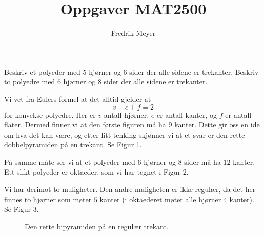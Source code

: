 \documentclass[11pt, norsk]{article}
\begin{document}
\title{Oppgaver MAT2500}
\author{Fredrik Meyer}
\maketitle 
\begin{oppg}
Beskriv et polyeder med $5$ hjørner og $6$ sider der alle sidene er trekanter. Beskriv to polyedre med $6$ hjørner og $8$ sider der alle sidene er trekanter.
\end{oppg}
\begin{losn}
Vi vet fra Eulers formel at det alltid gjelder at
\[
v-e+f = 2
\]
for konvekse polyedre. Her er $v$ antall hjørner, $e$ er antall kanter, og $f$ er antall flater. Dermed finner vi at den første figuren må ha $9$ kanter. Dette gir oss en ide om hva det kan være, og etter litt tenking skjønner vi at et svar er den rette dobbelpyramiden på en trekant. Se Figur 1.

På samme måte ser vi at et polyeder med $6$ hjørner og $8$ sider må ha $12$ kanter. Ett slikt polyeder er oktaeder, som vi har tegnet i Figur 2. 

Vi har derimot to muligheter. Den andre muligheten er ikke regulær, da det her finnes to hjørner som møter $5$ kanter (i oktaederet møter alle hjørner $4$ kanter). Se Figur 3.

\begin{figure}
\begin{center}

\end{center}
\caption{Den rette bipyramiden på en regulær trekant.}
\end{figure}


\end{losn}
\end{document}
